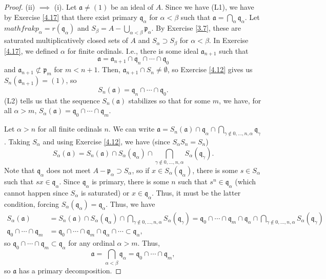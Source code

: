 \begin{proof}
(ii) $\implies$ (i). Let $\mathfrak{a} \neq (1)$ be an ideal of $A$. Since we have (L1), we have by Exercise \ref{4.17} that there exist primary $\mathfrak{q}_{\alpha}$ for $\alpha < \beta$ such that
$\mathfrak{a} = \bigcap_{\alpha} \mathfrak{q}_{\alpha}$. Let $mathfrak{p}_{\alpha} = r(\mathfrak{q}_{\alpha})$ and $S_{\beta} = A - \bigcup_{\alpha < \beta} \mathfrak{p}_{\alpha}$. By Exercise \ref{3.7},
these are saturated multiplicatively closed sets of $A$ and $S_{\alpha} \supset S_{\beta}$ for $\alpha < \beta$. In Exercise \ref{4.17}, we defined $\alpha$ for finite ordinals. I.e., there is some ideal 
$\mathfrak{a}_{n+1}$ such that 
$$\mathfrak{a} = \mathfrak{a}_{n+1} \cap \mathfrak{q}_n \cap \cdots \cap \mathfrak{q}_0$$
and $\mathfrak{a}_{n+1} \not\subset \mathfrak{p}_m$ for $m < n+1$. Then, $\mathfrak{a}_{n+1} \cap S_n \neq \emptyset$, so Exercise \ref{4.12} gives us $S_n(\mathfrak{a}_{n+1}) = (1)$, so 
$$S_n(\mathfrak{a}) = \mathfrak{q}_n \cap \cdots \cap \mathfrak{q}_0.$$
(L2) tells us that the sequence $S_n(\mathfrak{a})$ stabilizes so that for some $m$, we have, for all $\alpha > m$, $S_{\alpha}(\mathfrak{a}) = \mathfrak{q}_0 \cap \cdots \cap \mathfrak{q}_m$.

Let $\alpha > n$ for all finite ordinals $n$. We can write $\mathfrak{a} = S_n(\mathfrak{a}) \cap \mathfrak{q}_{\alpha} \cap \bigcap_{\gamma \not\in 0,\ldots,n,\alpha}\mathfrak{q}_{\gamma}$. Taking 
$S_{\alpha}$ and using Exercise \ref{4.12}, we have (since $S_{\alpha} S_n = S_n$)
$$S_{\alpha}(\mathfrak{a}) = S_n(\mathfrak{a}) \cap S_{\alpha}(\mathfrak{q}_{\alpha}) \cap \bigcap_{\gamma \not\in 0,\ldots,n,\alpha}S_{\alpha}(\mathfrak{q}_{\gamma}).$$
Note that $\mathfrak{q}_{\alpha}$ does not meet $A - \mathfrak{p}_{\alpha} \supset S_{\alpha}$, so if $x \in S_{\alpha}(\mathfrak{q}_{\alpha})$, there is some $s \in S_{\alpha}$ such
that $sx \in \mathfrak{q}_{\alpha}$. Since $\mathfrak{q}_{\alpha}$ is primary, there is some $n$ such that $s^n \in \mathfrak{q}_{\alpha}$ (which cannot happen since $S_{\alpha}$ is saturated) or
$x \in \mathfrak{q}_{\alpha}$. Thus, it must be the latter condition, forcing $S_{\alpha}(\mathfrak{q}_{\alpha}) = \mathfrak{q}_{\alpha}$. Thus, we have
\begin{align*}
S_{\alpha}(\mathfrak{a}) &= S_n(\mathfrak{a}) \cap S_{\alpha}(\mathfrak{q}_{\alpha}) \cap \bigcap_{\gamma \not\in 0,\ldots,n,\alpha}S_{\alpha}(\mathfrak{q}_{\gamma})
= \mathfrak{q}_0 \cap \cdots \cap \mathfrak{q}_m \cap \mathfrak{q}_{\alpha} \cap \bigcap_{\gamma \not\in 0,\ldots,n,\alpha}S_{\alpha}(\mathfrak{q}_{\gamma}) \\
\mathfrak{q}_0 \cap \cdots \cap \mathfrak{q}_m &= \mathfrak{q}_0 \cap \cdots \cap \mathfrak{q}_m \cap \mathfrak{q}_{\alpha} \cap \cdots \subset \mathfrak{q}_{\alpha},
\end{align*}
so $\mathfrak{q}_0 \cap \cdots \cap \mathfrak{q}_m \subset \mathfrak{q}_{\alpha}$ for any ordinal $\alpha > m$. Thus,
$$\mathfrak{a} = \bigcap_{\alpha < \beta}\mathfrak{q}_{\alpha} = \mathfrak{q}_0 \cap \cdots \cap \mathfrak{q}_m,$$
so $\mathfrak{a}$ has a primary decomposition.
\end{proof}

